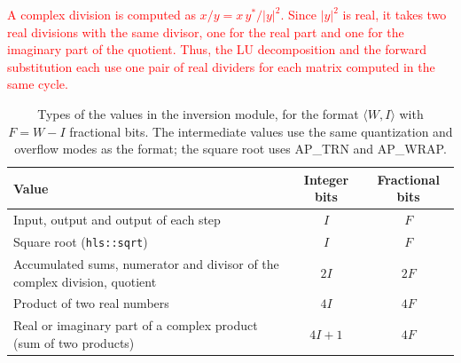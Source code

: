 \textcolor{red}{A complex division is computed as $x/y = x\,y^*/|y|^2$. Since $|y|^2$ is real, it takes two real divisions with the same divisor, one for the real part and one for the imaginary part of the quotient. Thus, the LU decomposition and the forward substitution each use one pair of real dividers for each matrix computed in the same cycle.}

\begin{table}[!ht]
\caption[Types of the values in the inversion module, for the format $\langle W, I\rangle$ with $F = W - I$ fractional bits.]{Types of the values in the inversion module, for the format $\langle W, I\rangle$ with $F = W - I$ fractional bits. The intermediate values use the same quantization and overflow modes as the format; the square root uses AP\_TRN and AP\_WRAP.}
\label{tab:tipos-intermediarios}
\vspace{4pt} %
\centering
\footnotesize
\renewcommand{\arraystretch}{1.2}
\begin{tabular}{p{7.4cm}cc}
\toprule
\textbf{Value} & \textbf{Integer bits} & \textbf{Fractional bits} \\
\midrule
Input, output and output of each step & $I$ & $F$ \\
Square root (\texttt{hls::sqrt}) & $I$ & $F$ \\
Accumulated sums, numerator and divisor of the complex division, quotient & $2I$ & $2F$ \\
Product of two real numbers & $4I$ & $4F$ \\
Real or imaginary part of a complex product (sum of two products) & $4I + 1$ & $4F$ \\
\bottomrule
\end{tabular}
\vspace{4pt}
\end{table}


